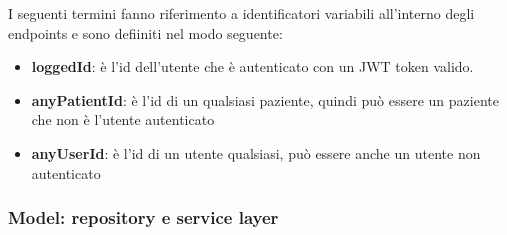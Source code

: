 \documentclass[a4paper]{article}
\begin{document}
\noindent
I seguenti termini fanno riferimento a identificatori variabili all'interno degli endpoints
e sono defiiniti nel modo seguente:
\begin{itemize}
  \item \textbf{loggedId}: è l'id dell'utente che è autenticato
  con un JWT token valido.
  \item \textbf{anyPatientId}: è l'id di un qualsiasi paziente, quindi può 
  essere un paziente che non è l'utente autenticato
  \item \textbf{anyUserId}: è l'id di un utente qualsiasi, può essere anche un utente non autenticato
\end{itemize}

\subsubsection{Model: repository e service layer}
\end{document}
